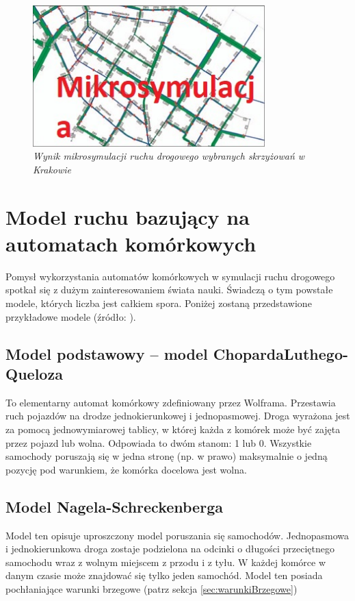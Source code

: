\documentclass{sprawozdanie-agh}
\begin{document}
		\begin{figure}[H]
			\centering
			\captionsetup{justification=centering}
			\includegraphics[width=0.8\textwidth]{Mikrosymulacja.jpg}
			\caption{\textit{Wynik mikrosymulacji ruchu drogowego wybranych skrzyżowań w Krakowie}}
			\label{fig:Mikrosymulacja}
		\end{figure}
	
		\section{Model ruchu bazujący na automatach komórkowych}
	
		Pomysł wykorzystania automatów komórkowych w symulacji ruchu drogowego spotkał się z dużym zainteresowaniem świata nauki. Świadczą o tym powstałe modele, których liczba jest całkiem spora. Poniżej zostaną przedstawione przykładowe modele (źródło: \cite{czasopisnoLogistyka}).
	
		\subsection{Model podstawowy – model ChopardaLuthego-Queloza} 
  
		To elementarny automat komórkowy zdefiniowany przez Wolframa. Przestawia ruch pojazdów na drodze jednokierunkowej i jednopasmowej. Droga wyrażona jest za pomocą jednowymiarowej tablicy, w której każda z komórek może być zajęta przez pojazd lub wolna. Odpowiada to dwóm stanom: 1 lub 0. Wszystkie samochody poruszają się w jedna stronę (np. w prawo) maksymalnie o jedną pozycję pod warunkiem, że komórka docelowa jest wolna.

		\subsection{Model Nagela-Schreckenberga}

		Model ten opisuje uproszczony model poruszania się samochodów. Jednopasmowa i jednokierunkowa droga zostaje podzielona na odcinki o długości przeciętnego samochodu wraz z wolnym miejscem z przodu i z tyłu. W każdej komórce w danym czasie może znajdować się tylko jeden samochód. Model ten posiada pochłaniające warunki brzegowe (patrz sekcja \ref{sec:warunkiBrzegowe})
\end{document}
